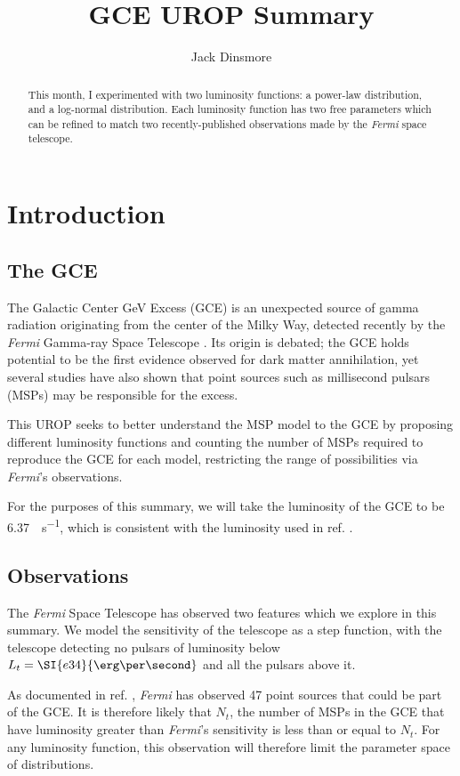 \documentclass{C://Aliases//Dropbox-MIT//Latex_Templates//personal}
\author{Jack Dinsmore}
\title{GCE UROP Summary}
\begin{document}
\maketitle

\begin{abstract}
This month, I experimented with two luminosity functions: a power-law distribution, and a log-normal distribution. Each luminosity function has two free parameters which can be refined to match two recently-published observations made by the \textit{Fermi} space telescope.
\end{abstract}


\section{Introduction}
\subsection{The GCE}
The Galactic Center GeV Excess (GCE) is an unexpected source of gamma radiation originating from the center of the Milky Way, detected  recently by the \textit{Fermi} Gamma-ray Space Telescope \cite{fermilab}. Its origin is debated; the GCE holds potential to be the first evidence observed for dark matter annihilation, yet several studies have also shown that point sources such as millisecond pulsars (MSPs) may be responsible for the excess.

This UROP seeks to better understand the MSP model to the GCE by proposing different luminosity functions and counting the number of MSPs required to reproduce the GCE for each model, restricting the range of possibilities via \textit{Fermi}'s observations.

For the purposes of this summary, we will take the luminosity of the GCE to be \SI{6.37}{\erg \per\second}, which is consistent with the luminosity used in ref. \cite{fermilab}.


\subsection{Observations}
The \textit{Fermi} Space Telescope has observed two features which we explore in this summary. We model the sensitivity of the telescope as a step function, with the telescope detecting no pulsars of luminosity below $L_{t} = \SI{e34}{\erg\per\second}$ and all the pulsars above it.

As documented in ref. \cite{fermilab}, \textit{Fermi} has observed 47 point sources that could be part of the GCE. It is therefore likely that $N_t$, the number of MSPs in the GCE that have luminosity greater than \textit{Fermi}'s sensitivity is less than or equal to $N_t$. For any luminosity function, this observation will therefore limit the parameter space of distributions.
\end{document}
